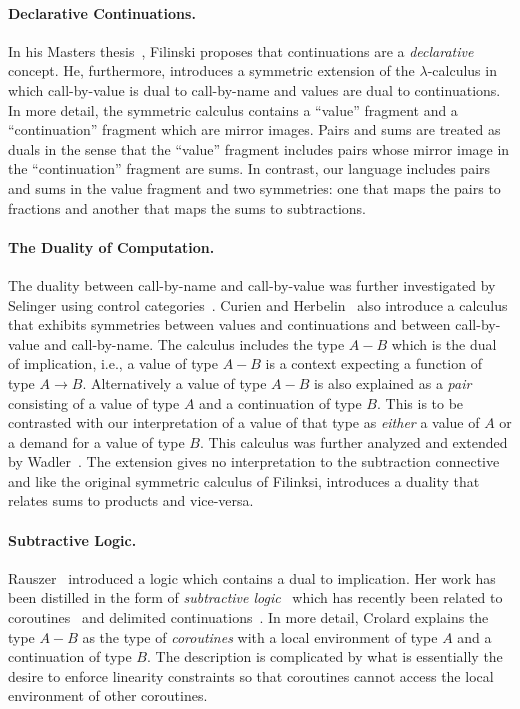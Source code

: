 \documentclass[preprint]{sigplanconf}
\begin{document}
{\paragraph*{Declarative Continuations.} 
In his Masters thesis~\cite{Filinski:1989:DCI:648332.755574}, Filinski
proposes that continuations are a \emph{declarative} concept. He,
furthermore, introduces a symmetric extension of the $\lambda$-calculus in
which call-by-value is dual to call-by-name and values are dual to
continuations. In more detail, the symmetric calculus contains a ``value''
fragment and a ``continuation'' fragment which are mirror images. Pairs and
sums are treated as duals in the sense that the ``value'' fragment includes
pairs whose mirror image in the ``continuation'' fragment are sums. In
contrast, our language includes pairs and sums in the value fragment and two
symmetries: one that maps the pairs to fractions and another that maps the
sums to subtractions.

\paragraph*{The Duality of Computation.}
The duality between call-by-name and call-by-value was further investigated
by Selinger using control
categories~\cite{Selinger:2001:CCD:966910.966911}. Curien and
Herbelin~\cite{Curien:2000} also introduce a calculus that exhibits
symmetries between values and continuations and between call-by-value and
call-by-name. The calculus includes the type $A-B$ which is the dual of
implication, i.e., a value of type $A-B$ is a context expecting a function of
type $A \rightarrow B$. Alternatively a value of type $A-B$ is also explained
as a \emph{pair} consisting of a value of type $A$ and a continuation of type
$B$. This is to be contrasted with our interpretation of a value of that type
as \emph{either} a value of $A$ or a demand for a value of type $B$. This
calculus was further analyzed and extended by
Wadler~\cite{Wadler:2003,DBLP:conf/rta/Wadler05}. The extension gives no
interpretation to the subtraction connective and like the original symmetric
calculus of Filinksi, introduces a duality that relates sums to products and
vice-versa.

\paragraph*{Subtractive Logic.} 
Rauszer~\cite{springerlink:10.1007/BF02120864,rauszer,rauszer2} introduced a
logic which contains a dual to implication. Her work has been distilled in
the form of \emph{subtractive logic}~\cite{Crolard01} which has recently been
related to coroutines~\cite{Crolard01082004} and delimited
continuations~\cite{Ariola:2009:TFD:1743339.1743381}.  In more detail,
Crolard explains the type $A-B$ as the type of \emph{coroutines} with a local
environment of type $A$ and a continuation of type $B$. The description is
complicated by what is essentially the desire to enforce linearity
constraints so that coroutines cannot access the local environment of other
coroutines. 

}
\end{document}
